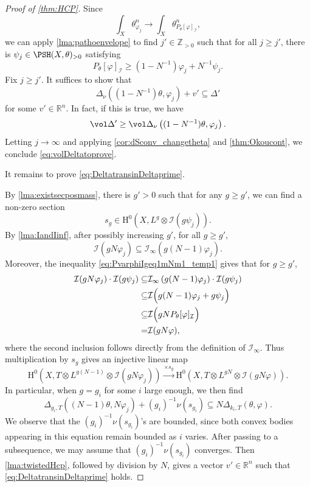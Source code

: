 \begin{proof}[Proof of \cref{thm:HCP}]
Since
\[
    \int_X\theta_{\varphi_j}^n\to \int_X\theta_{P_\theta[\varphi]_{\mathcal I}}^n,
\]
we can apply \cref{lma:pathoenvelope} to find $j'\in \mathbb{Z}_{>0}$ such that for all $j\geq j'$, there is $\psi_j\in \PSH(X,\theta)_{>0}$ satisfying
\begin{equation}\label{eq:PvarphiIgeq1mNm1_temp1}
P_{\theta}[\varphi]_{\mathcal{I}}\geq \left(1-N^{-1}\right)\varphi_j+N^{-1} \psi_j.
\end{equation}
Fix $j\geq j'$. It suffices to show that
\begin{equation}\label{eq:DeltatransinDeltaprime}
    \Delta_{\nu}\left((1-N^{-1})\theta,\varphi_{j}\right)+v'\subseteq \Delta'
\end{equation}
for some $v'\in \mathbb{R}^n$. In fact, if this is true, we have
\[
\vol \Delta'\geq \vol \Delta_{\nu}\left((1-N^{-1})\theta,\varphi_j\right).
\]
Letting $j\to\infty$ and applying \cref{cor:dSconv_changetheta} and \cref{thm:Okoucont}, we conclude \eqref{eq:volDeltatoprove}.

It remains to prove \eqref{eq:DeltatransinDeltaprime}.

By \cref{lma:existsecposmass}, there is $g'>0$ such that for any $g\geq g'$, we can find a non-zero section
\[
    s_g\in \mathrm{H}^0\left(X,L^g\otimes\mathcal I(g\psi_j)\right).
\]
By \cref{lma:IandIinf}, after possibly increasing $g'$, for all $g\geq g'$,
\[
    \mathcal I\left(gN\varphi_j\right)\subseteq \mathcal I_\infty\left(g(N-1)\varphi_j\right).
\]
Moreover, the inequality \eqref{eq:PvarphiIgeq1mNm1_temp1} gives that for $g\geq g'$,
\[
\begin{aligned}
    \mathcal I(gN\varphi_j)\cdot\mathcal I(g\psi_j)\subseteq & \mathcal I_\infty\left(g(N-1)\varphi_j\right)\cdot\mathcal I(g\psi_j)\\
    \subseteq & \mathcal I\Bigl(g(N-1)\varphi_j+g\psi_j\Bigr)\\
    \subseteq & \mathcal I\Bigl(gN P_\theta[\varphi]_{\mathcal I}\Bigr)\\
    =&\mathcal I(gN\varphi),
\end{aligned}
\]
where the second inclusion follows directly from the definition of $\mathcal I_\infty$. Thus multiplication by $s_g$ gives an injective linear map
\[
    \mathrm{H}^0\left(X,T\otimes L^{g(N-1)}\otimes\mathcal I(gN\varphi_j)\right)
    \xrightarrow{\times s_g}
    \mathrm{H}^0\left(X,T\otimes L^{gN}\otimes\mathcal I(gN\varphi)\right).
\]
In particular, when $g=g_i$ for some $i$ large enough, we then find
\[
    \Delta_{g_i,T}\left((N-1)\theta,N\varphi_{j}\right)+(g_i)^{-1}\nu(s_{g_i})\subseteq N\Delta_{k_i,T}(\theta,\varphi).
\]
We observe that the $(g_i)^{-1}\nu(s_{g_i})$'s are bounded, since both convex bodies appearing in this equation remain bounded as $i$ varies.
After passing to a subsequence, we may assume that $(g_i)^{-1}\nu(s_{g_i})$ converges. Then \cref{lma:twistedHcp}, followed by division by $N$, gives a vector $v'\in \mathbb{R}^n$ such that \eqref{eq:DeltatransinDeltaprime} holds.


\end{proof}
